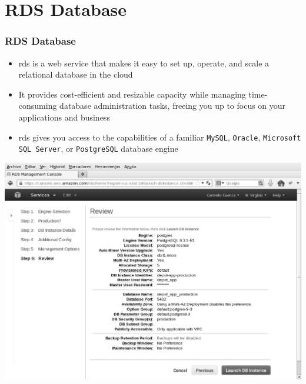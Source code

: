 \documentclass{beamer}
\begin{document}
\section{RDS Database}
\begin{frame}
\frametitle{RDS Database}
\begin{itemize}
 \item \acrfull{rds} is a web service that makes it easy to set up, operate, and scale a relational database in the cloud
 \item It provides cost-efficient and resizable capacity while managing time-consuming database administration tasks, freeing you up to focus on your applications and business
 \item \acrshort{rds} gives you access to the capabilities of a familiar \texttt{MySQL}, \texttt{Oracle}, \texttt{Microsoft SQL Server}, or \texttt{PostgreSQL} database engine
\end{itemize}
\begin{center}
      \includegraphics[scale=0.25]{rds.eps}
\end{center}
\end{frame}
\end{document}

